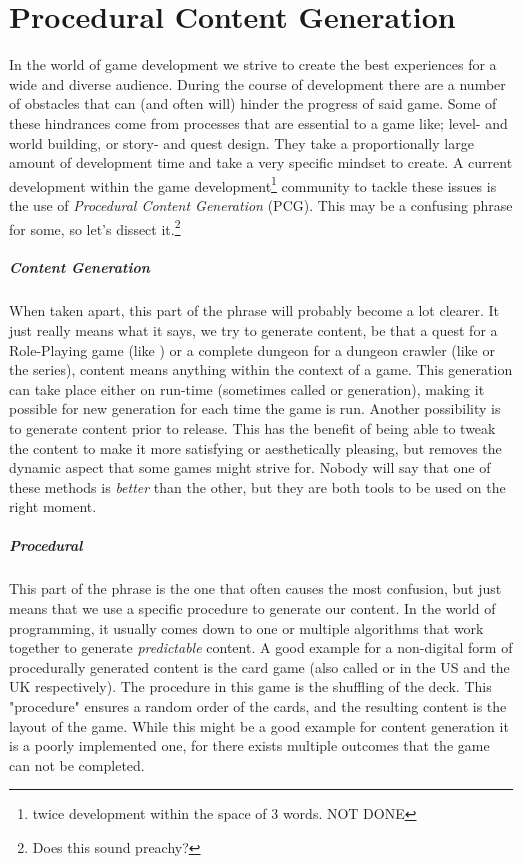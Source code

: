 \chapter{Procedural Content Generation}
In the world of game development we strive to create the best experiences for a wide and diverse audience. During the course of development there are a number of obstacles that can (and often will) hinder the progress of said game. Some of these hindrances come from processes that are essential to a game like; level- and world building, or story- and quest design. They take a proportionally large amount of development time and take a very specific mindset to create. A current development within the game development\footnote{twice development within the space of 3 words. NOT DONE} community to tackle these issues is the use of \textit{Procedural Content Generation} (PCG). This may be a confusing phrase for some, so let's dissect it.\footnote{Does this sound preachy?}
\paragraph{Content Generation} When taken apart, this part of the phrase will probably become a lot clearer. It just really means what it says, we try to generate content, be that a quest for a Role-Playing game (like ) or a complete dungeon for a dungeon crawler (like  or the  series), content means anything within the context of a game. This generation can take place either on run-time (sometimes called  or  generation), making it possible for new generation for each time the game is run. Another possibility is to generate content prior to release. This has the benefit of being able to tweak the content to make it more satisfying or aesthetically pleasing, but removes the dynamic aspect that some games might strive for. Nobody will say that one of these methods is \emph{better} than the other, but they are both tools to be used on the right moment. \paragraph{Procedural} This part of the phrase is the one that often causes the most confusion, but just means that we use a specific procedure to generate our content. In the world of programming, it usually comes down to one or multiple algorithms that work together to generate \emph{predictable} content. A good example for a non-digital form of procedurally generated content is the card game  (also called  or  in the US and the UK respectively). The procedure in this game is the shuffling of the deck. This "procedure" ensures a random order of the cards, and the resulting content is the layout of the game. While this might be a good example for content generation it is a poorly implemented one, for there exists multiple outcomes that the game can not be completed.
